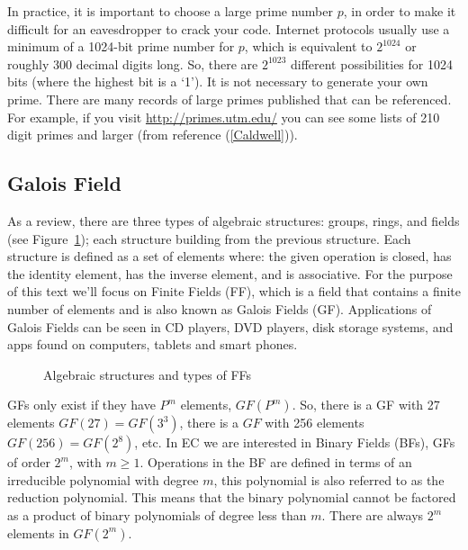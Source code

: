 In practice, it is important to choose a large prime number $p$, in order to make it difficult for an eavesdropper to crack your code.  Internet protocols usually use a minimum of a 1024-bit prime number for $p$, which is equivalent to $2^{1024}$ or roughly 300 decimal digits long.  So, there are $2^{1023}$ different possibilities for 1024 bits (where the highest bit is a `1'). It is not necessary to generate your own prime.  There are many records of large primes published that can be referenced. For example, if you visit \url{http://primes.utm.edu/} you can see some lists of 210 digit primes and larger (from reference (\ref{Caldwell})).
\subsection{Galois Field} 
As a review, there are three types of algebraic structures: groups, rings, and fields (see Figure~\ref{fig:DH:DHKE_3}); each structure building from the previous structure.  Each structure is defined as a set of elements where: the given operation is closed, has the identity element, has the inverse element, and is associative. For the purpose of this text we'll focus on Finite Fields (FF), which is a field that contains a finite number of elements and is also known as Galois Fields (GF). Applications of Galois Fields can be seen in CD players, DVD players, disk storage systems, and apps found on computers, tablets and smart phones.
\begin{figure}[H]
	  \caption{\label{fig:DH:DHKE_3} Algebraic structures and types of FFs }
\end{figure}
 GFs only exist if they have $P^m$ elements, $GF(P^m)$. So, there is a GF with 27 elements $GF(27) = GF(3^3)$, there is a $GF$ with 256 elements $GF(256) = GF(2^8)$, etc.  In EC we are interested in Binary Fields (BFs), GFs of order $2^m$, with $m \geq 1$.  Operations in the BF are defined in terms of an irreducible polynomial with degree $m$, this polynomial is also referred to as the reduction polynomial.  This means that the binary polynomial cannot be factored as a product of binary polynomials of degree less than $m$.  There are always $2^m$ elements in $GF(2^m)$.

